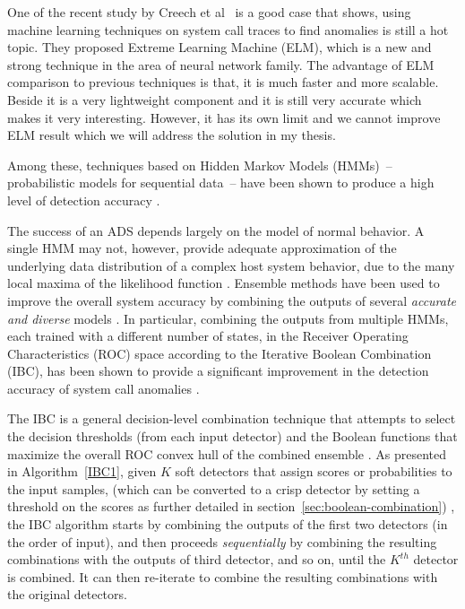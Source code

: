 One of the recent study by Creech et al~\cite{Creech2014} is a good case that shows, using machine learning techniques on system call traces to find anomalies is still a hot topic. They proposed Extreme Learning Machine (ELM), which is a new and strong technique in the area of neural network family. The advantage of ELM comparison to previous techniques is that, it is much faster and more scalable. Beside it is a very lightweight component and it is still very accurate which makes it very interesting. However, it has its own limit and we cannot improve ELM result which we will address the solution in my thesis.


Among these, techniques based on Hidden Markov Models (HMMs)~-- probabilistic models for sequential data~-- have been shown to produce a high level of detection accuracy \cite{Du2004,Gao2002,Hoang2004,Hu2010,Wang2004,Warrender1999,Zhang2003,Khreich2009-ICC, Sultana2012, Murtaza2012}.

The success of an ADS depends largely on the model of normal behavior.
A single HMM may not, however, provide adequate approximation of the underlying data distribution of a complex host system behavior, due to the many local maxima of the likelihood function \cite{Khreich2009-ICC}.
Ensemble methods have been used to improve the overall system accuracy by combining the outputs of several \textit{accurate and diverse} models \cite{Kittler1998,Dietterich2000,Kuncheva2004b,Zhou2012}.
In particular, combining the outputs from multiple HMMs, each trained with a different number of states, in the Receiver Operating Characteristics (ROC) space according to the Iterative Boolean Combination (IBC), has been shown to provide a significant improvement in the detection accuracy of system call anomalies \cite{Khreich2010-ICPR}.

The IBC is a general decision-level combination technique that attempts to select the decision thresholds (from each input detector) and the Boolean functions that maximize the overall ROC convex hull of the combined ensemble \cite{Khreich2010-ICPR}.
As presented in Algorithm~\ref{IBC1}, given $K$ soft detectors that assign scores or probabilities to the input samples, (which can be converted to a crisp detector by setting a threshold on the scores as further detailed in section~\ref{sec:boolean-combination}) , the IBC algorithm starts by combining the outputs of the first two detectors (in the order of input), and then proceeds \textit{sequentially} by combining the resulting combinations with the outputs of third detector, and so on, until the $K^{th}$ detector is combined.
It can then re-iterate to combine the resulting combinations with the original detectors.

